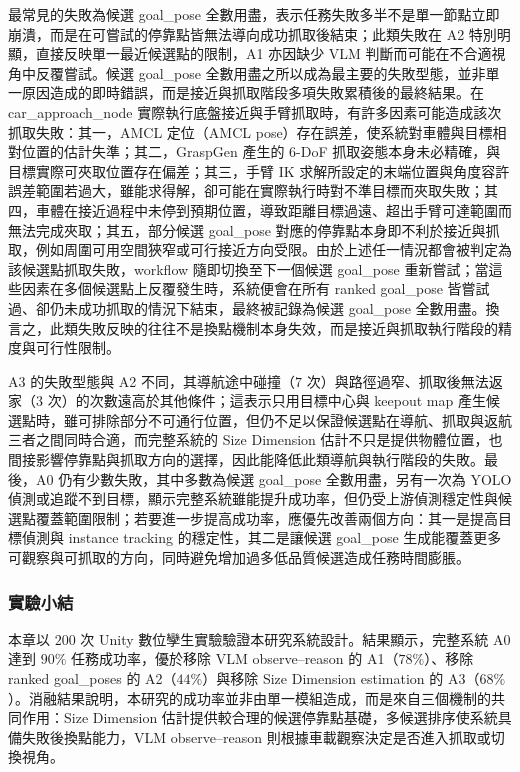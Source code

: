 \documentclass[12pt,a4paper]{article}
\makeatletter
\renewcommand\paragraph{\@startsection{paragraph}{4}{\z@}{1.3em}{0.5em}{\normalsize\bfseries}}
\makeatother
\begin{document}
\paragraph{失敗模式}
最常見的失敗為候選 goal\_pose 全數用盡，表示任務失敗多半不是單一節點立即崩潰，而是在可嘗試的停靠點皆無法導向成功抓取後結束；此類失敗在 A2 特別明顯，直接反映單一最近候選點的限制，A1 亦因缺少 VLM 判斷而可能在不合適視角中反覆嘗試。候選 goal\_pose 全數用盡之所以成為最主要的失敗型態，並非單一原因造成的即時錯誤，而是接近與抓取階段多項失敗累積後的最終結果。在 car\_approach\_node 實際執行底盤接近與手臂抓取時，有許多因素可能造成該次抓取失敗：其一，AMCL 定位（AMCL pose）存在誤差，使系統對車體與目標相對位置的估計失準；其二，GraspGen 產生的 6-DoF 抓取姿態本身未必精確，與目標實際可夾取位置存在偏差；其三，手臂 IK 求解所設定的末端位置與角度容許誤差範圍若過大，雖能求得解，卻可能在實際執行時對不準目標而夾取失敗；其四，車體在接近過程中未停到預期位置，導致距離目標過遠、超出手臂可達範圍而無法完成夾取；其五，部分候選 goal\_pose 對應的停靠點本身即不利於接近與抓取，例如周圍可用空間狹窄或可行接近方向受限。由於上述任一情況都會被判定為該候選點抓取失敗，workflow 隨即切換至下一個候選 goal\_pose 重新嘗試；當這些因素在多個候選點上反覆發生時，系統便會在所有 ranked goal\_pose 皆嘗試過、卻仍未成功抓取的情況下結束，最終被記錄為候選 goal\_pose 全數用盡。換言之，此類失敗反映的往往不是換點機制本身失效，而是接近與抓取執行階段的精度與可行性限制。

A3 的失敗型態與 A2 不同，其導航途中碰撞（$7$ 次）與路徑過窄、抓取後無法返家（$3$ 次）的次數遠高於其他條件；這表示只用目標中心與 keepout map 產生候選點時，雖可排除部分不可通行位置，但仍不足以保證候選點在導航、抓取與返航三者之間同時合適，而完整系統的 Size Dimension 估計不只是提供物體位置，也間接影響停靠點與抓取方向的選擇，因此能降低此類導航與執行階段的失敗。最後，A0 仍有少數失敗，其中多數為候選 goal\_pose 全數用盡，另有一次為 YOLO 偵測或追蹤不到目標，顯示完整系統雖能提升成功率，但仍受上游偵測穩定性與候選點覆蓋範圍限制；若要進一步提高成功率，應優先改善兩個方向：其一是提高目標偵測與 instance tracking 的穩定性，其二是讓候選 goal\_pose 生成能覆蓋更多可觀察與可抓取的方向，同時避免增加過多低品質候選造成任務時間膨脹。

\subsubsection{實驗小結}

本章以 $200$ 次 Unity 數位孿生實驗驗證本研究系統設計。結果顯示，完整系統 A0 達到 $90\%$ 任務成功率，優於移除 VLM observe--reason 的 A1（$78\%$）、移除 ranked goal\_poses 的 A2（$44\%$）與移除 Size Dimension estimation 的 A3（$68\%$）。消融結果說明，本研究的成功率並非由單一模組造成，而是來自三個機制的共同作用：Size Dimension 估計提供較合理的候選停靠點基礎，多候選排序使系統具備失敗後換點能力，VLM observe--reason 則根據車載觀察決定是否進入抓取或切換視角。
\end{document}
